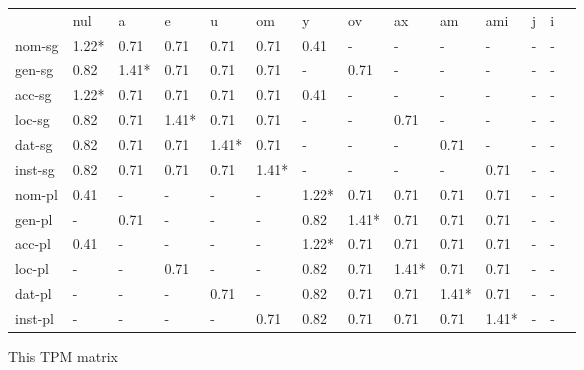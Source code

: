 \documentclass{article}
\begin{document}
\begin{tabular}{llllllllllllll}\toprule
                  &nul     &a       &e       &u       &om      &y       &ov      &ax      &am      &ami     &j       &i       \\ 
nom-sg         & 1.22*  &  0.71  &  0.71  &  0.71  &  0.71  &  0.41  &    -   &    -   &    -   &    -   &    -   &    -   \\ 
gen-sg         &  0.82  & 1.41*  &  0.71  &  0.71  &  0.71  &    -   &  0.71  &    -   &    -   &    -   &    -   &    -   \\ 
acc-sg         & 1.22*  &  0.71  &  0.71  &  0.71  &  0.71  &  0.41  &    -   &    -   &    -   &    -   &    -   &    -   \\ 
loc-sg         &  0.82  &  0.71  & 1.41*  &  0.71  &  0.71  &    -   &    -   &  0.71  &    -   &    -   &    -   &    -   \\ 
dat-sg         &  0.82  &  0.71  &  0.71  & 1.41*  &  0.71  &    -   &    -   &    -   &  0.71  &    -   &    -   &    -   \\ 
inst-sg        &  0.82  &  0.71  &  0.71  &  0.71  & 1.41*  &    -   &    -   &    -   &    -   &  0.71  &    -   &    -   \\ 
nom-pl         &  0.41  &    -   &    -   &    -   &    -   & 1.22*  &  0.71  &  0.71  &  0.71  &  0.71  &    -   &    -   \\ 
gen-pl         &    -   &  0.71  &    -   &    -   &    -   &  0.82  & 1.41*  &  0.71  &  0.71  &  0.71  &    -   &    -   \\ 
acc-pl         &  0.41  &    -   &    -   &    -   &    -   & 1.22*  &  0.71  &  0.71  &  0.71  &  0.71  &    -   &    -   \\ 
loc-pl         &    -   &    -   &  0.71  &    -   &    -   &  0.82  &  0.71  & 1.41*  &  0.71  &  0.71  &    -   &    -   \\ 
dat-pl         &    -   &    -   &    -   &  0.71  &    -   &  0.82  &  0.71  &  0.71  & 1.41*  &  0.71  &    -   &    -   \\ 
inst-pl        &    -   &    -   &    -   &    -   &  0.71  &  0.82  &  0.71  &  0.71  &  0.71  & 1.41*  &    -   &    -   \\ 
\end{tabular}

 \vspace{0.2in}
 

 This TPM matrix  
\end{document}
